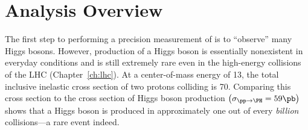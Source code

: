 \section{Analysis Overview}
\label{sec:analysis_overview}
The first step to performing a precision measurement of \mH is to ``observe'' many Higgs bosons.
However, production of a Higgs boson is essentially nonexistent in everyday conditions and is still extremely rare even in the high-energy \pp collisions of the LHC (Chapter~\ref{ch:lhc}).
At a center-of-mass energy of 13\TeV, the total inclusive inelastic cross section of two protons colliding is 70\mb.
Comparing this cross section to the cross section of Higgs boson production $\left( \sigma_{\pp \to \PH} = 59\pb \right)$
shows that a Higgs boson is produced in approximately one out of every \emph{billion} \pp collisions---a rare event indeed.

